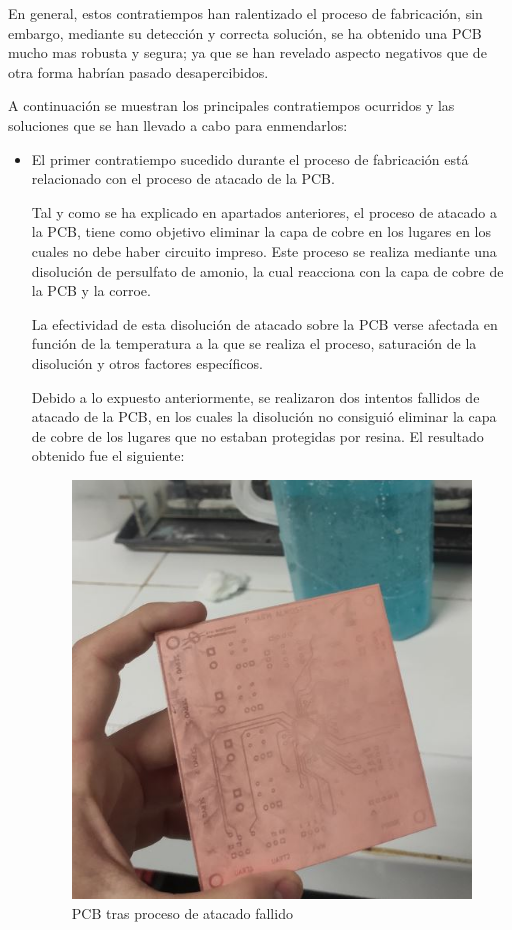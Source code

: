 En general, estos contratiempos han ralentizado el proceso de fabricación, sin embargo, mediante su detección y correcta solución, se ha obtenido una \ac{PCB} mucho mas robusta y segura; ya que se han revelado aspecto negativos que de otra forma habrían pasado desapercibidos.

A continuación se muestran los principales contratiempos ocurridos y las soluciones que se han llevado a cabo para enmendarlos:

\begin{itemize}
    \item El primer contratiempo sucedido durante el proceso de fabricación está relacionado con el proceso de atacado de la \ac{PCB}.
    
    Tal y como se ha explicado en apartados anteriores, el proceso de atacado a la \ac{PCB}, tiene como objetivo eliminar la capa de cobre  en los lugares en los cuales no debe haber circuito impreso. Este proceso se realiza mediante una disolución de persulfato de amonio, la cual reacciona con la capa de cobre de la \ac{PCB} y la corroe.
    
    La efectividad de esta disolución de atacado sobre la \ac{PCB} verse afectada en función de la temperatura a la que se realiza el proceso, saturación de la disolución y otros factores específicos.
    
    Debido a lo expuesto anteriormente, se realizaron dos intentos fallidos de atacado de la \ac{PCB}, en los cuales la disolución no consiguió eliminar la capa de cobre de los lugares que no estaban protegidas por resina. El resultado obtenido fue el siguiente:
    
    \begin{figure}[H]
    \centering 
    \includegraphics[width=0.55\linewidth]{pictures/FalloPCB.jpg}
    \caption{\ac{PCB} tras proceso de atacado fallido}
    \label{fig:kdiagram}
    \end{figure}
    

\end{itemize}
